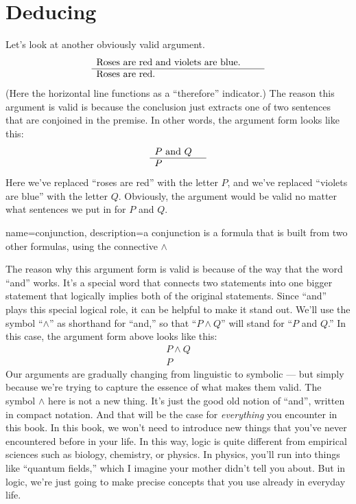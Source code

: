 \chapter{Deducing} \label{deduce}

Let's look at another obviously valid argument.
\[ \begin{array}{p{6cm}} Roses are red and violets are blue. \\ \hline
    Roses are red. \end{array} \] (Here the horizontal line functions
as a ``therefore'' indicator.)  The reason this argument is valid is
because the conclusion just extracts one of two sentences that are
conjoined in the premise.  In other words, the argument form looks
like this:
\[ \begin{array}{p{1.7cm}} 
  $P$ and $Q$ \\ \hline $P$ \end{array} \] Here we've replaced
``roses are red'' with the letter $P$, and we've replaced ``violets
are blue'' with the letter $Q$.  Obviously, the argument would be
valid no matter what sentences we put in for $P$ and $Q$.

{
  name=conjunction,
  description={a conjunction is a formula that is built from two other formulas,
    using the connective $\wedge$}
} 

The reason why this argument form is valid is because of the way that
the word ``and'' works.  It's a special word that connects two
statements into one bigger statement that logically implies both of
the original statements.  Since ``and'' plays this special logical
role, it can be helpful to make it stand out.  We'll use the symbol
``$\wedge$'' as shorthand for ``and,'' so that ``$P\wedge Q$'' will
stand for ``$P$ and $Q$.'' In this case, the argument form above looks
like this:
\[ \begin{array}{c} P\wedge Q \\ \hline P \end{array} \] Our arguments
are gradually changing from linguistic to symbolic --- but simply
because we're trying to capture the essence of what makes them valid.
The symbol $\wedge$ here is not a new thing.  It's just the good old
notion of ``and'', written in compact notation.  And that will be the
case for \textit{everything} you encounter in this book.  In this
book, we won't need to introduce new things that you've never
encountered before in your life.  In this way, logic is quite
different from empirical sciences such as biology, chemistry, or
physics.  In physics, you'll run into things like ``quantum fields,''
which I imagine your mother didn't tell you about.  But in logic,
we're just going to make precise concepts that you use already in
everyday life.

